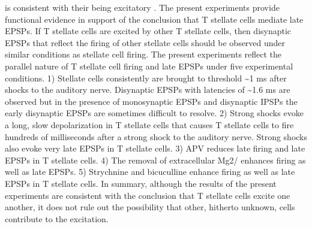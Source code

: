 \documentclass[10pt,a4paper]{article}
\begin{document}
\begin{itemize}
  is consistent with their being excitatory \citep{Oliver:1984,
    1987,SmithRhode:1989}. The present experiments provide functional evidence
  in support of the conclusion that T stellate cells mediate late EPSPs. If T
  stellate cells are excited by other T stellate cells, then disynaptic EPSPs
  that reflect the firing of other stellate cells should be observed under
  similar conditions as stellate cell firing. The present experiments reflect
  the parallel nature of T stellate cell firing and late EPSPs under five
  experimental conditions. 1) Stellate cells consistently are brought to
  threshold \~{}1 ms after shocks to the auditory nerve. Disynaptic EPSPs with
  latencies of \~{}1.6 ms are observed but in the presence of monosynaptic EPSPs
  and disynaptic IPSPs the early disynaptic EPSPs are sometimes difficult to
  resolve. 2) Strong shocks evoke a long, slow depolarization in T stellate
  cells that causes T stellate cells to fire hundreds of milliseconds after a
  strong shock to the auditory nerve.  Strong shocks also evoke very late EPSPs
  in T stellate cells. 3) APV reduces late firing and late EPSPs in T stellate
  cells. 4) The removal of extracellular Mg2/ enhances firing as well as late
  EPSPs. 5) Strychnine and bicuculline enhance firing as well as late EPSPs in T
  stellate cells. In summary, although the results of the present experiments
  are consistent with the conclusion that T stellate cells excite one another,
  it does not rule out the possibility that other, hitherto unknown, cells
  contribute to the excitation.
\end{itemize}
\end{document}
